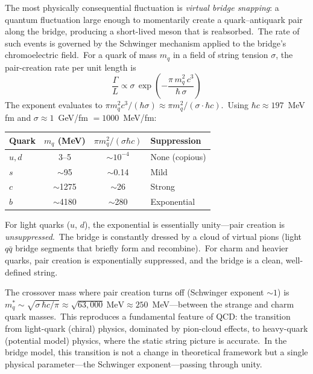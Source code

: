 ﻿\documentclass[12pt,letterpaper]{article}
\begin{document}
The most physically consequential fluctuation is \emph{virtual bridge
snapping}: a quantum fluctuation large enough to momentarily create a
quark--antiquark pair along the bridge, producing a short-lived meson
that is reabsorbed.\ The rate of such events is governed by the Schwinger
mechanism \cite{schwinger1951} applied to the bridge's chromoelectric
field.\ For a quark of mass $m_q$ in a field of string tension $\sigma$,
the pair-creation rate per unit length is
%
\begin{equation}
  \label{eq:schwinger-bridge}
  \frac{\Gamma}{L} \propto \sigma \,
    \exp\!\left(-\frac{\pi\,m_q^2\,c^3}{\hbar\,\sigma}\right)
\end{equation}
%
The exponent evaluates to $\pi m_q^2 c^3 / (\hbar\sigma) \approx
\pi m_q^2 / (\sigma \cdot \hbar c)$.\ Using $\hbar c \approx 197$~MeV\,fm
and $\sigma \approx 1$~GeV/fm $= 1000$~MeV/fm:
%
\begin{center}
\begin{tabular}{@{}lccl@{}}
\hline
\textbf{Quark} & $m_q$ (MeV) & $\pi m_q^2/(\sigma\hbar c)$ & \textbf{Suppression} \\
\hline
$u, d$ & 3--5   & $\sim 10^{-4}$ & None (copious) \\
$s$    & $\sim$95  & $\sim$0.14    & Mild \\
$c$    & $\sim$1275 & $\sim$26     & Strong \\
$b$    & $\sim$4180 & $\sim$280    & Exponential \\
\hline
\end{tabular}
\end{center}
%
For light quarks ($u$, $d$), the exponential is essentially unity---pair
creation is \emph{unsuppressed}.\ The bridge is constantly dressed by
a cloud of virtual pions (light $q\bar{q}$ bridge segments that briefly
form and recombine).\ For charm and heavier quarks, pair creation is
exponentially suppressed, and the bridge is a clean, well-defined string.

The crossover mass where pair creation turns off (Schwinger exponent
$\sim 1$) is
$m_q^* \sim \sqrt{\sigma\,\hbar c/\pi} \approx \sqrt{63{,}000}~\text{MeV}
\approx 250$~MeV---between the strange and charm quark masses.\ This
reproduces a fundamental feature of QCD: the transition from
light-quark (chiral) physics, dominated by pion-cloud effects, to
heavy-quark (potential model) physics, where the static string picture
is accurate.\ In the bridge model, this transition is not a change in
theoretical framework but a single physical parameter---the Schwinger
exponent---passing through unity.
\end{document}
